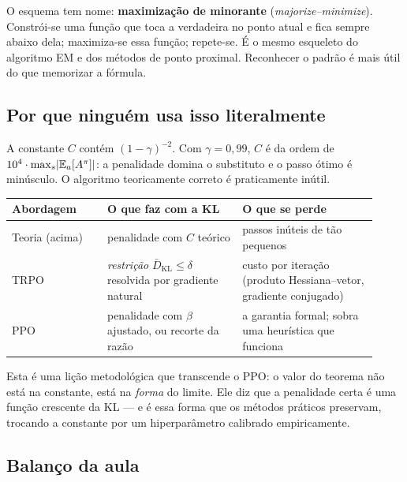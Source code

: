 \documentclass[11pt]{article}
\newcommand{\Advpi}{A^{\pol}}
\begin{document}
\begin{ideiabox}
  O esquema tem nome: \textbf{maximização de minorante} (\emph{majorize--minimize}).
  Constrói-se uma função que toca a verdadeira no ponto atual e fica sempre abaixo dela;
  maximiza-se essa função; repete-se. É o mesmo esqueleto do algoritmo EM e dos métodos
  de ponto proximal. Reconhecer o padrão é mais útil do que memorizar a fórmula.
\end{ideiabox}

\subsection{Por que ninguém usa isso literalmente}

A constante $C$ contém $(1-\gamma)^{-2}$. Com $\gamma = 0{,}99$, $C$ é da ordem de
$10^4\cdot\max_s\abs{\E_a[\Advpi]}$: a penalidade domina o substituto e o passo ótimo é
minúsculo. O algoritmo teoricamente correto é praticamente inútil.

\begin{center}\small
\begin{tabular}{@{}>{\raggedright\arraybackslash}p{0.24\linewidth}
                 >{\raggedright\arraybackslash}p{0.34\linewidth}
                 >{\raggedright\arraybackslash}p{0.34\linewidth}@{}}
\toprule
\textbf{Abordagem} & \textbf{O que faz com a KL} & \textbf{O que se perde} \\
\midrule
Teoria (acima) & penalidade com $C$ teórico & passos inúteis de tão pequenos \\
TRPO & \emph{restrição} $\bar D_{\mathrm{KL}} \le \delta$ resolvida por gradiente natural &
  custo por iteração (produto Hessiana--vetor, gradiente conjugado) \\
PPO & penalidade com $\beta$ ajustado, ou recorte da razão &
  a garantia formal; sobra uma heurística que funciona \\
\bottomrule
\end{tabular}
\end{center}

\begin{alertabox}
  Esta é uma lição metodológica que transcende o PPO: o valor do teorema não está na
  constante, está na \emph{forma} do limite. Ele diz que a penalidade certa é uma função
  crescente da KL --- e é essa forma que os métodos práticos preservam, trocando a
  constante por um hiperparâmetro calibrado empiricamente.
\end{alertabox}

\subsection{Balanço da aula}
\end{document}
